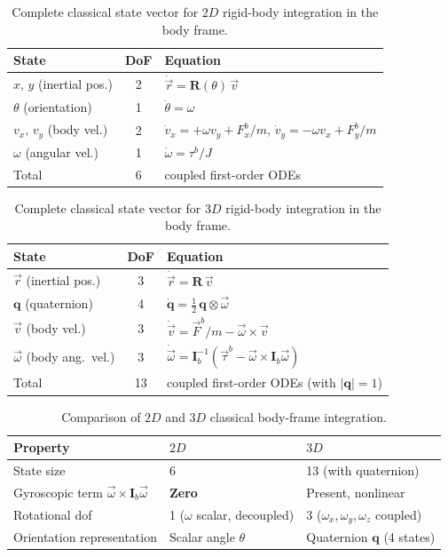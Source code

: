 \begin{table}[h!]
\centering\small
\begin{tabular}{p{3.5cm}|c|p{7.5cm}}
\hline
State & DoF & Equation \\
\hline
$x,\, y$ (inertial pos.) & 2 & $\dot{\vec{r}} = \mathbf{R}(\theta)\,\vec{v}$ \\
$\theta$ (orientation) & 1 & $\dot{\theta} = \omega$ \\
$v_x,\, v_y$ (body vel.) & 2 & $\dot{v}_x = +\omega v_y + F_x^b/m$,\;\; $\dot{v}_y = -\omega v_x + F_y^b/m$ \\
$\omega$ (angular vel.) & 1 & $\dot{\omega} = \tau^b/J$ \\
\hline
Total & 6 & \multicolumn{1}{l}{coupled first-order ODEs} \\
\hline
\end{tabular}
\caption{Complete classical state vector for $2D$ rigid-body integration in the body frame.}
\label{tab:state_2d_classical}
\end{table}

\begin{table}[h!]
\centering\small
\begin{tabular}{p{3.5cm}|c|p{7.5cm}}
\hline
State & DoF & Equation \\
\hline
$\vec{r}$ (inertial pos.) & 3 &
$\dot{\vec{r}} = \mathbf{R}\,\vec{v}$ \\
$\mathbf{q}$ (quaternion) & 4 &
$\dot{\mathbf{q}} = \frac{1}{2}\,\mathbf{q}\otimes\vec{\omega}$ \\
$\vec{v}$ (body vel.) & 3 &
$\dot{\vec{v}} = \vec{F}^b/m - \vec{\omega}\times\vec{v}$ \\
$\vec{\omega}$ (body ang.\ vel.) & 3 &
$\dot{\vec{\omega}} = \mathbf{I}_b^{-1}\!\left(\vec{\tau}^b
 - \vec{\omega}\times\mathbf{I}_b\vec{\omega}\right)$ \\
\hline
Total & 13 & \multicolumn{1}{l}{coupled first-order ODEs (with $|\mathbf{q}|=1$)} \\
\hline
\end{tabular}
\caption{Complete classical state vector for $3D$ rigid-body integration in the body
frame.}
\label{tab:state_3d_classical}
\end{table}

\begin{table}[h!]
\centering\small
\begin{tabular}{p{4.5cm}|p{3.95cm}|p{3.95cm}}
\hline
Property & $2D$ &
$3D$ \\
\hline
State size & 6 & 13 (with quaternion) \\
Gyroscopic term $\vec{\omega}\times\mathbf{I}_b\vec{\omega}$ &
\textbf{Zero} & Present, nonlinear \\
Rotational dof & 1 ($\omega$ scalar, decoupled) &
3 ($\omega_x, \omega_y, \omega_z$ coupled) \\
Orientation representation & Scalar angle $\theta$ &
Quaternion $\mathbf{q}$ (4 states) \\
\hline
\end{tabular}
\caption{Comparison of $2D$ and $3D$ classical body-frame integration.}
\label{tab:2d_3d_classical}
\end{table}

